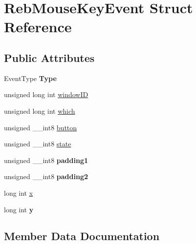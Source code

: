 \hypertarget{struct_reb_mouse_key_event}{}\section{Reb\+Mouse\+Key\+Event Struct Reference}
\label{struct_reb_mouse_key_event}
\subsection*{Public Attributes}
\begin{DoxyCompactItemize}
\item 
Event\+Type {\bfseries Type}\hypertarget{struct_reb_mouse_key_event_a2cf9cbeb0b11dfb9833002fc7a59bfc7}{}\label{struct_reb_mouse_key_event_a2cf9cbeb0b11dfb9833002fc7a59bfc7}

\item 
unsigned long int \hyperlink{struct_reb_mouse_key_event_a7f0b015a25849ac48c0561f24e11e1e1}{window\+ID}
\item 
unsigned long int \hyperlink{struct_reb_mouse_key_event_a77af8b913a00cdba24d154c3054619a5}{which}
\item 
unsigned \+\_\+\+\_\+int8 \hyperlink{struct_reb_mouse_key_event_a11847818d7d2a32d7ab75912a09c0775}{button}
\item 
unsigned \+\_\+\+\_\+int8 \hyperlink{struct_reb_mouse_key_event_a59cb4348c4a76b805bd2febab9cb80ae}{state}
\item 
unsigned \+\_\+\+\_\+int8 {\bfseries padding1}\hypertarget{struct_reb_mouse_key_event_a3b37569b61c6cd49ad296d586f2b4e56}{}\label{struct_reb_mouse_key_event_a3b37569b61c6cd49ad296d586f2b4e56}

\item 
unsigned \+\_\+\+\_\+int8 {\bfseries padding2}\hypertarget{struct_reb_mouse_key_event_a001485be3ee0d6c579d3e9b53a64c8e4}{}\label{struct_reb_mouse_key_event_a001485be3ee0d6c579d3e9b53a64c8e4}

\item 
long int \hyperlink{struct_reb_mouse_key_event_a7cb986f6394a03e391c3430864165528}{x}
\item 
long int {\bfseries y}\hypertarget{struct_reb_mouse_key_event_a9b0b45f714c68be2f71021631c2baee3}{}\label{struct_reb_mouse_key_event_a9b0b45f714c68be2f71021631c2baee3}

\end{DoxyCompactItemize}


\subsection{Member Data Documentation}
